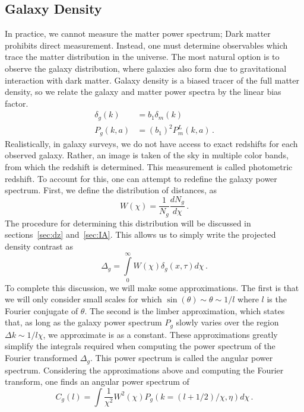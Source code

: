 \subsection{Galaxy Density}
In practice, we cannot measure the matter power spectrum; Dark matter prohibits direct measurement. Instead, one must determine observables which trace the matter distribution in the universe. The most natural option is to observe the galaxy distribution, where galaxies also form due to gravitational interaction with dark matter. Galaxy density is a biased tracer of the full matter density, so we relate the galaxy and matter power spectra by the linear bias factor.
\begin{equation}
	\begin{split}
		\delta_g(k) &= b_1 \delta_m(k) \\
		P_g(k,a) &= (b_1)^2P_m^L(k,a)\,.
	\end{split}
\end{equation}
Realistically, in galaxy surveys, we do not have access to exact redshifts for each observed galaxy. Rather, an image is taken of the sky in multiple color bands, from which the redshift is determined. This measurement is called photometric redshift. To account for this, one can attempt to redefine the galaxy power spectrum. First, we define the distribution of distances, as
\begin{equation}
	W(\chi) = \frac{1}{N_g}\frac{dN_g}{d\chi}\,.
\end{equation}
The procedure for determining this distribution will be discussed in sections~\ref{sec:dz} and~\ref{sec:IA}. This allows us to simply write the projected density contrast as
\begin{equation}
	\Delta_g = \int\limits_0^\infty W(\chi)\delta_g(x,\tau)d\chi\,.
\end{equation}
To complete this discussion, we will make some approximations. The first is that we will only consider small scales for which $\sin(\theta)\sim \theta \sim 1/l$ where $l$ is the Fourier conjugate of $\theta$. The second is the limber approximation, which states that, as long as the galaxy power spectrum $P_g$ slowly varies over the region $\Delta k \sim 1/l\chi$, we approximate is as a constant. These approximations greatly simplify the integrals required when computing the power spectrum of the Fourier transformed $\Delta_g$. This power spectrum is called the angular power spectrum. Considering the approximations above and computing the Fourier transform, one finds an angular power spectrum of
\begin{equation}
 	C_g(l) =\int \frac{1}{\chi^2}W^2(\chi)P_g(k=(l+1/2)/\chi,\eta) d\chi\,.
\end{equation} 
